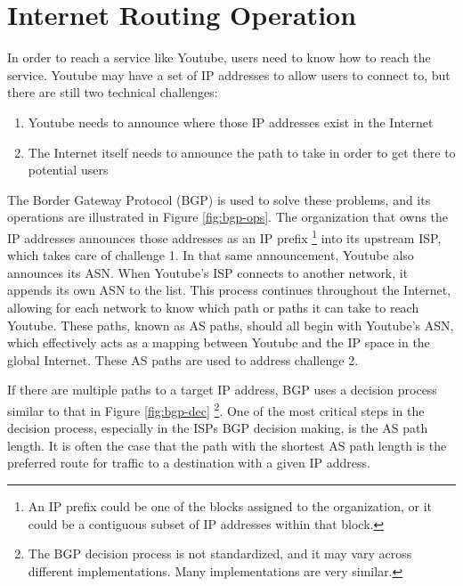 \documentclass[conference]{IEEEtran}
\begin{document}
\section{Internet Routing Operation}
In order to reach a service like Youtube, users need to know how to reach the service.  Youtube may have a set of IP addresses to allow users to connect to, but there are still two technical challenges:
\begin{enumerate}
 \item Youtube needs to announce where those IP addresses exist in the Internet
 \item The Internet itself needs to announce the path to take in order to get there to potential users
\end{enumerate}
The Border Gateway Protocol (BGP) is used to solve these problems, and its operations are illustrated in Figure \ref{fig:bgp-ops}.  The organization that owns the IP addresses announces those addresses as an IP prefix \footnote{An IP prefix could be one of the blocks assigned to the organization, or it could be a contiguous subset of IP addresses within that block.} into its upstream ISP, which takes care of challenge 1.  In that same announcement, Youtube also announces its ASN.  When Youtube's ISP connects to another network, it appends its own ASN to the list.  This process continues throughout the Internet, allowing for each network to know which path or paths it can take to reach Youtube.  These paths, known as AS paths, should all begin with Youtube's ASN, which effectively acts as a mapping between Youtube and the IP space in the global Internet.  These AS paths are used to address challenge 2.

If there are multiple paths to a target IP address, BGP uses a decision process similar to that in Figure \ref{fig:bgp-dec} \footnote{The BGP decision process is not standardized, and it may vary across different implementations.  Many implementations are very similar.}.  One of the most critical steps in the decision process, especially in the ISPs BGP decision making, is the AS path length.  It is often the case that the path with the shortest AS path length is the preferred route for traffic to a destination with a given IP address.
\end{document}
